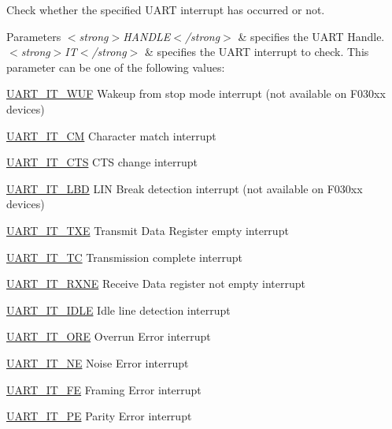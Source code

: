 Check whether the specified U\+A\+RT interrupt has occurred or not. 


\begin{DoxyParams}{Parameters}
{\em $<$strong$>$\+H\+A\+N\+D\+L\+E$<$/strong$>$} & specifies the U\+A\+RT Handle. \\
\hline
{\em $<$strong$>$\+I\+T$<$/strong$>$} & specifies the U\+A\+RT interrupt to check. This parameter can be one of the following values\+: \begin{DoxyItemize}
\item \hyperlink{group___u_a_r_t___interrupt__definition_gab8899f6307781779f65a7c18aabb3204}{U\+A\+R\+T\+\_\+\+I\+T\+\_\+\+W\+UF} Wakeup from stop mode interrupt (not available on F030xx devices) \item \hyperlink{group___u_a_r_t___interrupt__definition_ga4c22e866bce68975a180828012489106}{U\+A\+R\+T\+\_\+\+I\+T\+\_\+\+CM} Character match interrupt \item \hyperlink{group___u_a_r_t___interrupt__definition_ga986d271478550f9afa918262ca642333}{U\+A\+R\+T\+\_\+\+I\+T\+\_\+\+C\+TS} C\+TS change interrupt \item \hyperlink{group___u_a_r_t___interrupt__definition_gabca5e77508dc2dd9aa26fcb683d9b988}{U\+A\+R\+T\+\_\+\+I\+T\+\_\+\+L\+BD} L\+IN Break detection interrupt (not available on F030xx devices) \item \hyperlink{group___u_a_r_t___interrupt__definition_ga552636e2af516d578856f5ee2ba71ed7}{U\+A\+R\+T\+\_\+\+I\+T\+\_\+\+T\+XE} Transmit Data Register empty interrupt \item \hyperlink{group___u_a_r_t___interrupt__definition_gab9a4dc4e8cea354fd60f4117513b2004}{U\+A\+R\+T\+\_\+\+I\+T\+\_\+\+TC} Transmission complete interrupt \item \hyperlink{group___u_a_r_t___interrupt__definition_gac1bedf7a65eb8c3f3c4b52bdb24b139d}{U\+A\+R\+T\+\_\+\+I\+T\+\_\+\+R\+X\+NE} Receive Data register not empty interrupt \item \hyperlink{group___u_a_r_t___interrupt__definition_ga9781808d4f9999061fc2da36572191d9}{U\+A\+R\+T\+\_\+\+I\+T\+\_\+\+I\+D\+LE} Idle line detection interrupt \item \hyperlink{group___u_a_r_t___i_t_ga333810cb588a739ad49042b9f564a6b2}{U\+A\+R\+T\+\_\+\+I\+T\+\_\+\+O\+RE} Overrun Error interrupt \item \hyperlink{group___u_a_r_t___i_t_ga35c77abdf7744b407d5ba751e546e965}{U\+A\+R\+T\+\_\+\+I\+T\+\_\+\+NE} Noise Error interrupt \item \hyperlink{group___u_a_r_t___i_t_ga98cbd9e918bcc56f329a803febaab468}{U\+A\+R\+T\+\_\+\+I\+T\+\_\+\+FE} Framing Error interrupt \item \hyperlink{group___u_a_r_t___interrupt__definition_ga55f922ddcf513509710ade5d7c40a1db}{U\+A\+R\+T\+\_\+\+I\+T\+\_\+\+PE} Parity Error interrupt \end{DoxyItemize}
\\
\hline
\end{DoxyParams}

